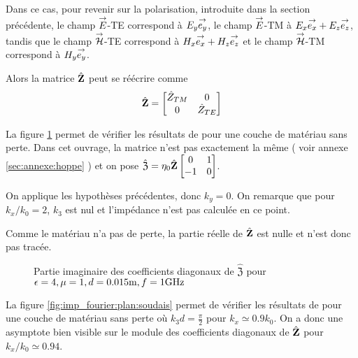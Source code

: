         Dans ce cas, pour revenir sur la polarisation, introduite dans la section précédente, le champ \({\overset{\rightarrow}{E}}\)-TE correspond à \({E_y} {\overset{\rightarrow}{e_y}}\), le champ \({\overset{\rightarrow}{E}}\)-TM à \({E_x} {\overset{\rightarrow}{e_x}} + {E_z} {\overset{\rightarrow}{e_z}} \), tandis que le champ \({\overset{\rightarrow}{\mathcal{H}}}\)-TE correspond à \({H_x} {\overset{\rightarrow}{e_x}} + {H_z} {\overset{\rightarrow}{e_z}}\) et le champ \({\overset{\rightarrow}{\mathcal{H}}}\)-TM correspond à \({H_y} {\overset{\rightarrow}{e_y}}\).
        
        Alors la matrice \(\hat {\mathbf{Z}}\) peut se réécrire comme
        \begin{equation}
            \hat {\mathbf{Z}} =
            \begin{bmatrix}
                \hat Z_{TM} & 0
                \\
                0 & \hat Z_{TE}
            \end{bmatrix}
        \end{equation}


        La figure \ref{fig:imp_fourier:plan:hoppe} permet de vérifier les résultats de \cite[p.~33]{hoppe_impedance_1995} pour une couche de matériau sans perte. Dans cet ouvrage, la matrice n’est pas exactement la même ( voir annexe \ref{sec:annexe:hoppe} ) et on pose \(\hat{\mathfrak{Z}} = \eta_0\hat{\mathbf{Z}}\begin{bmatrix}0&1\\-1&0\end{bmatrix}\).

        On applique les hypothèses précédentes, donc \(k_y=0\). On remarque que pour \(k_x\slash k_0=2\), \(k_3\) est nul et l'impédance n'est pas calculée en ce point. 

        Comme le matériau n'a pas de perte, la partie réelle de \(\hat{\mathfrak{\mathbf{Z}}}\) est nulle et n'est donc pas tracée.

        \begin{figure}[!hbt]
            \centering
            
            \caption[Reproduction résultat Hoppe & Rahmat-Samii p.~33]{Partie imaginaire des coefficients diagonaux de \(\hat{\mathfrak Z}\) pour \(\epsilon = 4, \mu = 1, d=0.015\text{m}, f=1\text{GHz}\)}
            \label{fig:imp_fourier:plan:hoppe}
        \end{figure}

        La figure \ref{fig:imp_fourier:plan:soudais} permet de vérifier les résultats de \cite{soudais_3d_2017} pour une couche de matériau sans perte où \(k_3d = \frac{\pi}{2}\) pour \(k_x \simeq 0.9 k_0\). On a donc une asymptote bien visible sur le module des coefficients diagonaux de \(\hat{\mathbf{Z}}\) pour \(k_x\slash k_0 \simeq 0.94\).


